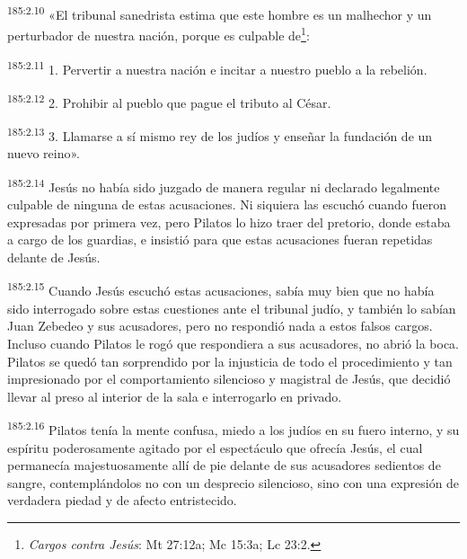 \par 
\textsuperscript{185:2.10} «El tribunal sanedrista estima que este hombre es un malhechor y un perturbador de nuestra nación, porque es culpable de\footnote{\textit{Cargos contra Jesús}: Mt 27:12a; Mc 15:3a; Lc 23:2.}:

\par 
\textsuperscript{185:2.11} 1. Pervertir a nuestra nación e incitar a nuestro pueblo a la rebelión.

\par 
\textsuperscript{185:2.12} 2. Prohibir al pueblo que pague el tributo al César.

\par 
\textsuperscript{185:2.13} 3. Llamarse a sí mismo rey de los judíos y enseñar la fundación de un nuevo reino».

\par 
\textsuperscript{185:2.14} Jesús no había sido juzgado de manera regular ni declarado legalmente culpable de ninguna de estas acusaciones. Ni siquiera las escuchó cuando fueron expresadas por primera vez, pero Pilatos lo hizo traer del pretorio, donde estaba a cargo de los guardias, e insistió para que estas acusaciones fueran repetidas delante de Jesús.

\par 
\textsuperscript{185:2.15} Cuando Jesús escuchó estas acusaciones, sabía muy bien que no había sido interrogado sobre estas cuestiones ante el tribunal judío, y también lo sabían Juan Zebedeo y sus acusadores, pero no respondió nada a estos falsos cargos. Incluso cuando Pilatos le rogó que respondiera a sus acusadores, no abrió la boca. Pilatos se quedó tan sorprendido por la injusticia de todo el procedimiento y tan impresionado por el comportamiento silencioso y magistral de Jesús, que decidió llevar al preso al interior de la sala e interrogarlo en privado.

\par 
\textsuperscript{185:2.16} Pilatos tenía la mente confusa, miedo a los judíos en su fuero interno, y su espíritu poderosamente agitado por el espectáculo que ofrecía Jesús, el cual permanecía majestuosamente allí de pie delante de sus acusadores sedientos de sangre, contemplándolos no con un desprecio silencioso, sino con una expresión de verdadera piedad y de afecto entristecido.

